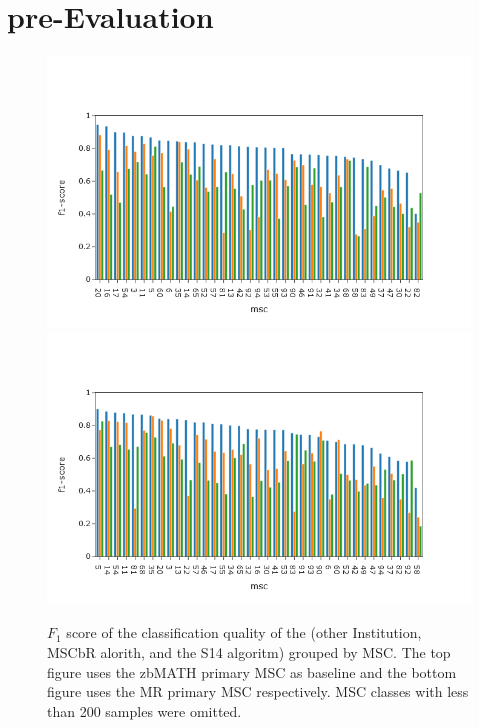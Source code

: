 \section{pre-Evaluation}
\begin{figure}[h]
  \centering
  \includegraphics[width=1.1\textwidth]{zbMr.png}
  \includegraphics[width=1.1\textwidth]{mrZb.png}
  \caption{$F_1$ score of the classification quality of the (other Institution, MSCbR alorith, and the S14 algoritm) grouped by MSC. The top figure uses the zbMATH primary MSC as baseline and the bottom figure uses the MR primary MSC respectively. MSC classes with less than 200 samples were omitted. }
\end{figure}


